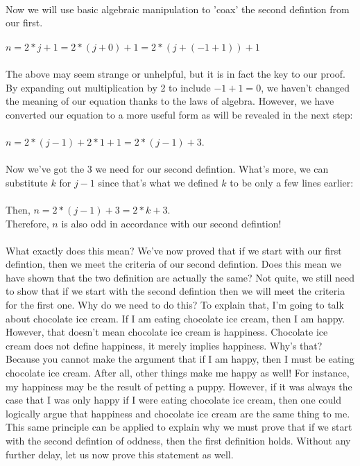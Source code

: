 \documentclass[a4paper,12pt]{article}
\begin{document}
\\
Now we will use basic algebraic manipulation to 'coax' the second defintion from our first.\\
\\
$n = 2*j + 1 = 2*(j + 0) + 1 = 2*(j + (-1 + 1)) + 1$\\
\\
The above may seem strange or unhelpful, but it is in fact the key to our proof. By expanding out multiplication by 2 to include $-1 + 1 = 0$, we haven't changed the meaning of our equation thanks to the laws of algebra. However, we have converted our equation to a more useful form as will be revealed in the next step:\\
\\
$n = 2*(j - 1) + 2*1 + 1 = 2*(j - 1) + 3$.\\
\\
Now we've got the $3$ we need for our second defintion. What's more, we can substitute $k$ for $j - 1$ since that's what we defined $k$ to be only a few lines earlier:\\
\\
Then, $n = 2*(j - 1) + 3 = 2*k + 3$.\\
Therefore, $n$ is also odd in accordance with our second defintion!\\
\\
What exactly does this mean? We've now proved that if we start with our first defintion, then we meet the criteria of our second defintion. Does this mean we have shown that the two definition are actually the same? Not quite, we still need to show that if we start with the second defintion then we will meet the criteria for the first one. Why do we need to do this? To explain that, I'm going to talk about chocolate ice cream. If I am eating chocolate ice cream, then I am happy. However, that doesn't mean chocolate ice cream is happiness. Chocolate ice cream does not define happiness, it merely implies happiness. Why's that? Because you cannot make the argument that if I am happy, then I must be eating chocolate ice cream. After all, other things make me happy as well! For instance, my happiness may be the result of petting a puppy. However, if it was always the case that I was only happy if I were eating chocolate ice cream, then one could logically argue that happiness and chocolate ice cream are the same thing to me. This same principle can be applied to explain why we must prove that if we start with the second defintion of oddness, then the first definition holds. Without any further delay, let us now prove this statement as well.\\
\end{document}
